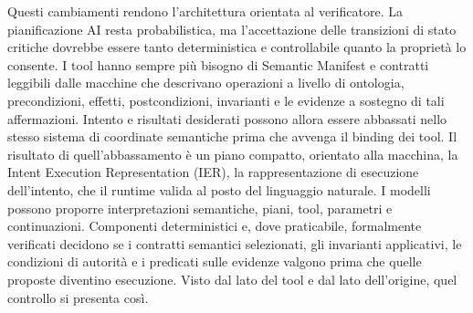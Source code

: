 \documentclass[10pt,oneside,openany]{book}
\begin{document}
Questi cambiamenti rendono l'architettura orientata al verificatore. La pianificazione AI resta probabilistica, ma l'accettazione delle transizioni di stato critiche dovrebbe essere tanto deterministica e controllabile quanto la proprietà lo consente. I tool hanno sempre più bisogno di Semantic Manifest e contratti leggibili dalle macchine che descrivano operazioni a livello di ontologia, precondizioni, effetti, postcondizioni, invarianti e le evidenze a sostegno di tali affermazioni. Intento e risultati desiderati possono allora essere abbassati nello stesso sistema di coordinate semantiche prima che avvenga il binding dei tool. Il risultato di quell'abbassamento è un piano compatto, orientato alla macchina, la Intent Execution Representation (IER), la rappresentazione di esecuzione dell'intento, che il runtime valida al posto del linguaggio naturale. I modelli possono proporre interpretazioni semantiche, piani, tool, parametri e continuazioni. Componenti deterministici e, dove praticabile, formalmente verificati decidono se i contratti semantici selezionati, gli invarianti applicativi, le condizioni di autorità e i predicati sulle evidenze valgono prima che quelle proposte diventino esecuzione. Visto dal lato del tool e dal lato dell'origine, quel controllo si presenta così.
\end{document}
